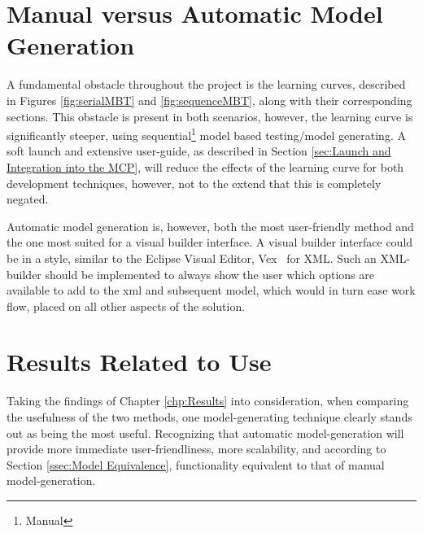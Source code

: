 \section{Manual versus Automatic Model Generation}
A fundamental obstacle throughout the project is the learning curves, described in Figures \ref{fig:serialMBT} and \ref{fig:sequenceMBT}, along with their corresponding sections. This obstacle is present in both scenarios, however, the learning curve is significantly steeper, using sequential\footnote{Manual} model based testing/model generating. A soft launch and extensive user-guide, as described in Section \ref{sec:Launch and Integration into the MCP}, will reduce the effects of the learning curve for both development techniques, however, not to the extend that this is completely negated.

Automatic model generation is, however, both the most user-friendly method and the one most suited for a visual builder interface. A visual builder interface could be in a style, similar to the Eclipse Visual Editor, Vex~\cite{vex} for XML. Such an XML-builder should be implemented to always show the user which options are available to add to the xml and subsequent model, which would in turn ease work flow, placed on all other aspects of the solution.

\section{Results Related to Use}
Taking the findings of Chapter \ref{chp:Results} into consideration, when comparing the usefulness of the two methods, one model-generating technique clearly stands out as being the most useful. Recognizing that automatic model-generation will provide more immediate user-friendliness, more scalability, and according to Section \ref{ssec:Model Equivalence}, functionality equivalent to that of manual model-generation.

